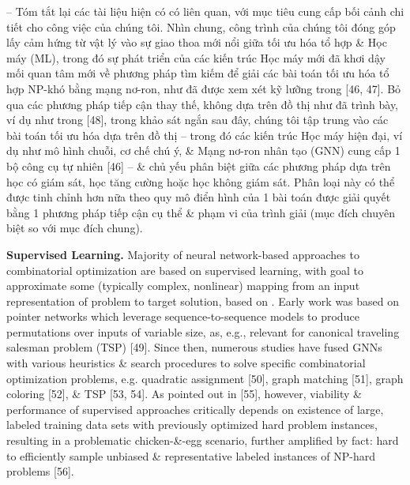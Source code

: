 \documentclass{article}
\begin{document}
\begin{itemize}
    -- Tóm tắt lại các tài liệu hiện có có liên quan, với mục tiêu cung cấp bối cảnh chi tiết cho công việc của chúng tôi. Nhìn chung, công trình của chúng tôi đóng góp lấy cảm hứng từ vật lý vào sự giao thoa mới nổi giữa tối ưu hóa tổ hợp \& Học máy (ML), trong đó sự phát triển của các kiến trúc Học máy mới đã khơi dậy mối quan tâm mới về phương pháp tìm kiếm để giải các bài toán tối ưu hóa tổ hợp NP-khó bằng mạng nơ-ron, như đã được xem xét kỹ lưỡng trong [46, 47]. Bỏ qua các phương pháp tiếp cận thay thế, không dựa trên đồ thị như đã trình bày, ví dụ như trong [48], trong khảo sát ngắn sau đây, chúng tôi tập trung vào các bài toán tối ưu hóa dựa trên đồ thị -- trong đó các kiến trúc Học máy hiện đại, ví dụ như mô hình chuỗi, cơ chế chú ý, \& Mạng nơ-ron nhân tạo (GNN) cung cấp 1 bộ công cụ tự nhiên [46] -- \& chủ yếu phân biệt giữa các phương pháp dựa trên học có giám sát, học tăng cường hoặc học không giám sát. Phân loại này có thể được tinh chỉnh hơn nữa theo quy mô điển hình của 1 bài toán được giải quyết bằng 1 phương pháp tiếp cận cụ thể \& phạm vi của trình giải (mục đích chuyên biệt so với mục đích chung).

    {\bf Supervised Learning.} Majority of neural network-based approaches to combinatorial optimization are based on supervised learning, with goal to approximate some (typically complex, nonlinear) mapping from an input representation of problem to target solution, based on . Early work was based on pointer networks which leverage sequence-to-sequence models to produce permutations over inputs of variable size, as, e.g., relevant for canonical traveling salesman problem (TSP) [49]. Since then, numerous studies have fused GNNs with various heuristics \& search procedures to solve specific combinatorial optimization problems, e.g. quadratic assignment [50], graph matching [51], graph coloring [52], \& TSP [53, 54]. As pointed out in [55], however, viability \& performance of supervised approaches critically depends on existence of large, labeled training data sets with previously optimized hard problem instances, resulting in a problematic chicken-\&-egg scenario, further amplified by fact: hard to efficiently sample unbiased \& representative labeled instances of NP-hard problems [56].


\end{itemize}
\end{document}
